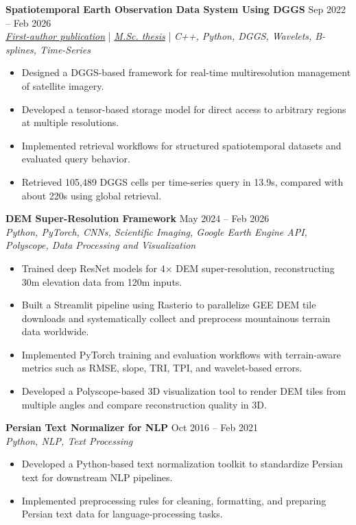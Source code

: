 \documentclass[a4paper,10pt]{article}
\begin{document}
\noindent
\textbf{Spatiotemporal Earth Observation Data System Using DGGS} \hfill Sep 2022 -- Feb 2026 \\
\textit{\href{https://doi.org/10.3390/rs17040570}{First-author publication}} | \textit{\href{https://ucalgary.scholaris.ca/items/114b394b-e516-4732-bd3a-45dd6160d480}{M.Sc. thesis}} | \textit{C++, Python, DGGS, Wavelets, B-splines, Time-Series}
\begin{itemize}[leftmargin=0.25in]
    \item Designed a DGGS-based framework for real-time multiresolution management of satellite imagery.
    \item Developed a tensor-based storage model for direct access to arbitrary regions at multiple resolutions.
    \item Implemented retrieval workflows for structured spatiotemporal datasets and evaluated query behavior.
    \item Retrieved 105,489 DGGS cells per time-series query in 13.9s, compared with about 220s using global retrieval.
\end{itemize}

\noindent
\textbf{DEM Super-Resolution Framework} \hfill May 2024 -- Feb 2026 \\
\textit{Python, PyTorch, CNNs, Scientific Imaging, Google Earth Engine API, Polyscope, Data Processing and Visualization}
\begin{itemize}[leftmargin=0.25in]
    \item Trained deep ResNet models for 4$\times$ DEM super-resolution, reconstructing 30m elevation data from 120m inputs.
    \item Built a Streamlit pipeline using Rasterio to parallelize GEE DEM tile downloads and systematically collect and preprocess mountainous terrain data worldwide.
    \item Implemented PyTorch training and evaluation workflows with terrain-aware metrics such as RMSE, slope, TRI, TPI, and wavelet-based errors.
    \item Developed a Polyscope-based 3D visualization tool to render DEM tiles from multiple angles and compare reconstruction quality in 3D.
\end{itemize}

\noindent
\textbf{Persian Text Normalizer for NLP} \hfill Oct 2016 -- Feb 2021 \\
\textit{Python, NLP, Text Processing}
\begin{itemize}[leftmargin=0.25in]
    \item Developed a Python-based text normalization toolkit to standardize Persian text for downstream NLP pipelines.
    \item Implemented preprocessing rules for cleaning, formatting, and preparing Persian text data for language-processing tasks.
\end{itemize}
\end{document}
